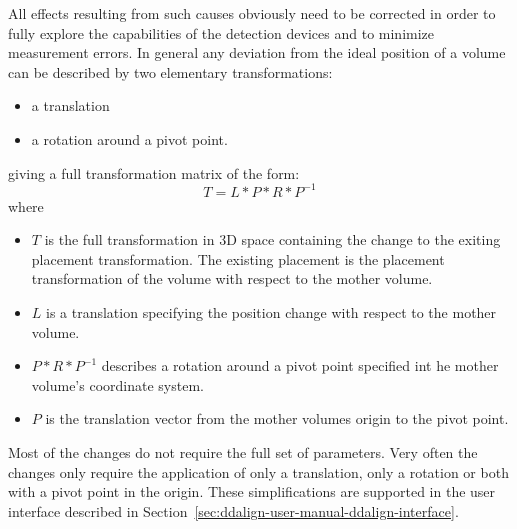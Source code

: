 \documentclass[10pt,a4paper]{article}
\begin{document}
All effects resulting from such causes obviously need to be corrected in order to 
fully explore the capabilities of the detection devices and to minimize 
measurement errors. In general any deviation from the ideal position of a volume
can be described by two elementary transformations:
\begin{itemize}\itemcompact
\item a translation
\item a rotation around a pivot point.
\end{itemize}
giving a full transformation matrix of the form:
\begin{equation}
T = L * P * R * P^{-1}
\end{equation}
where 
\begin{itemize}\itemcompact
\item $T$ is the full transformation in 3D space containing the change to the 
exiting placement transformation. The existing placement is the placement 
transformation of the volume with respect to the mother volume.
\item $L$ is a translation specifying the position change with respect to the 
    mother volume.
\item $P * R * P^{-1}$ describes a rotation around a pivot point specified 
    int he mother volume's coordinate system.
\item $P$ is the translation vector from the mother volumes origin to the 
    pivot point.
\end{itemize}
Most of the changes do not require the full set of parameters. Very often 
the changes only require the application of only a translation, only a rotation
or both with a pivot point in the origin. These simplifications are supported 
in the user interface described in 
Section~\ref{sec:ddalign-user-manual-ddalign-interface}.
\end{document}
